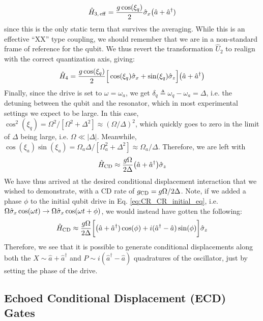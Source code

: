 \begin{equation}
\hat{H}_{3, \rm\, eff} = \frac{g\cos(\xi_q)}{2} \hat{\sigma}_x\big(\hat{a}+ \hat{a}^\dagger)
\end{equation}
since this is the only static term that survives the averaging. While this is an effective ``XX'' type coupling, we should remember that we are in a non-standard frame of reference for the qubit. We thus revert the transformation $\hat{U}_2$ to realign with the correct quantization axis, giving:
\begin{equation}
\hat{H}_4 =    \frac{g\cos(\xi_q)}{2} \Big[\cos(\xi_q)\hat{\sigma}_x +\sin(\xi_q)\hat{\sigma}_z\Big]\big(\hat{a}+\hat{a}^\dagger\big)
\end{equation}
Finally, since the drive is set to $\omega = \omega_a$, we get $\delta_q \triangleq \omega_q - \omega_a = \Delta$, i.e. the detuning between the qubit and the resonator, which in most experimental settings we expect to be large. In this case, $\cos^2(\xi_q)= \Omega^2 / [\Omega^2 + \Delta^2] \approx (\Omega/\Delta)^2$, which quickly goes to zero in the limit of $\Delta$ being large, i.e. $\Omega \ll |\Delta|$. Meanwhile, $\cos(\xi_a)\sin(\xi_a)= \Omega_a\Delta / [\Omega_a^2 + \Delta^2] \approx \Omega_a /\Delta$. Therefore, we are left with
\begin{equation}
\hat{H}_{\rm CD} \approx \frac{g\Omega }{2\Delta} \big(\hat{a}+\hat{a}^\dagger\big)\hat{\sigma}_z
\end{equation}
We have thus arrived at the desired conditional displacement interaction that we wished to demonstrate, with a CD rate of $g_{\rm CD} = g\Omega/2\Delta$. Note, if we added a phase $\phi$ to the initial qubit drive in Eq. \eqref{eq:CR_CR_initial_eq}, i.e. $\Omega\hat{\sigma}_x\cos(\omega t) \to \Omega\hat{\sigma}_x\cos(\omega t + \phi)$, we would instead have gotten the following:
\begin{equation}
\hat{H}_{\rm CD} \approx \frac{g\Omega }{2\Delta}\bigg[\big(\hat{a}+\hat{a}^\dagger)\cos(\phi) + i(\hat{a}^\dagger -\hat{a})\sin(\phi)\bigg]\hat{\sigma}_z 
\end{equation}
Therefore, we see that it is possible to generate conditional displacements along both the $X \sim \hat{a}+\hat{a}^\dagger$ and $P \sim i(\hat{a}^\dagger -\hat{a})$ quadratures of the oscillator, just by setting the phase of the drive.

\subsection{Echoed Conditional Displacement (ECD) Gates\label{sec:2_ECD}}

